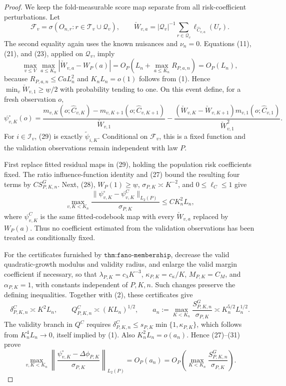 \documentclass{article}
\begin{document}
\begin{proof}
We keep the fold-measurable score map separate from all risk-coefficient perturbations.  Let
\[
 \mathcal F_v=\sigma(O_{n,r}:r\in\mathcal T_v\cup\mathcal Q_v),
 \qquad
 \check W_{v,a}=|\mathcal Q_v|^{-1}\sum_{r\in\mathcal Q_v}
 \ell_{\widehat C_{v,a}}(U_r).
\]
The second equality again uses the known nuisances and \(\nu_n=0\).  Equations (11), (21), and (23), applied on \(\mathcal Q_v\), imply
\[
 \max_{v\leq V}\max_{a\leq K_n}|\check W_{v,a}-W_P(a)|
 =O_P\!\left(L_n+\max_{a\leq K_n}R_{P,a,n}\right)=O_P(L_n),                 \tag{28}
\]
because \(R_{P,a,n}\leq CaL_n^2\) and \(K_nL_n=o(1)\) follows from (1).  Hence \(\min_v\check W_{v,1}\geq\underline w/2\) with probability tending to one.  On this event define, for a fresh observation \(o\),
\[
 \psi_{v,K}^{\circ}(o)=
 \frac{m_{v,K}(o;\widehat C_{v,K})-m_{v,K+1}(o;\widehat C_{v,K+1})}{\check W_{v,1}}
 -\frac{(\check W_{v,K}-\check W_{v,K+1})m_{v,1}(o;\widehat C_{v,1})}
 {\check W_{v,1}^2}.                                                         \tag{29}
\]
For \(i\in\mathcal I_v\), (29) is exactly \(\widetilde\psi_{i,K}\).  Conditional on \(\mathcal F_v\), this is a fixed function and the validation observations remain independent with law \(P\).

First replace fitted residual maps in (29), holding the population risk coefficients fixed.  The ratio influence-function identity and (27) bound the resulting four terms by \(CS^G_{P,K,n}\).  Next, (28), \(W_P(1)\geq\underline w\), \(\sigma_{P,K}\asymp K^{-2}\), and \(0\leq\ell_C\leq1\) give
\[
 \max_{v,K<K_n}\frac{\|\psi_{v,K}^{\circ}-\psi_{v,K}^{C}\|_{L_2(P)}}{\sigma_{P,K}}
 \leq CK_n^2L_n,                                                            \tag{30}
\]
where \(\psi_{v,K}^{C}\) is the same fitted-codebook map with every \(\check W_{v,a}\) replaced by \(W_P(a)\).  Thus no coefficient estimated from the validation observations has been treated as conditionally fixed.

For the certificates furnished by \(\texttt{thm:fano-membership}\), decrease the valid quadratic-growth modulus and validity radius, and enlarge the valid margin coefficient if necessary, so that \(\lambda_{P,K}=c_\lambda K^{-3}\), \(\kappa_{P,K}=c_\kappa/K\), \(M_{P,K}=C_M\), and \(\alpha_{P,K}=1\), with constants independent of \(P,K,n\).  Such changes preserve the defining inequalities.  Together with (2), these certificates give
\[
 \delta^C_{P,K,n}\asymp K^2L_n,\qquad
 Q^C_{P,K,n}\asymp(KL_n)^{1/2},\qquad
 a_n:=\max_{K<K_n}\frac{S^G_{P,K,n}}{\sigma_{P,K}}\asymp K_n^{5/2}L_n^{1/2}. \tag{31}
\]
The validity branch in \(Q^C\) requires \(\delta^C_{P,K,n}\leq s_{P,K}\min\{1,\kappa_{P,K}\}\), which follows from \(K_n^4L_n\to0\), itself implied by (1).  Also \(K_n^2L_n=o(a_n)\).  Hence (27)--(31) prove
\[
 \max_{v,K<K_n}\left\|
 \frac{\psi_{v,K}^{\circ}-\Delta\phi_{P,K}}{\sigma_{P,K}}
 \right\|_{L_2(P)}=O_P(a_n)
 =O_P\!\left(\max_{K<K_n}\frac{S^G_{P,K,n}}{\sigma_{P,K}}\right).          \tag{32}
\]


\end{proof}
\end{document}
